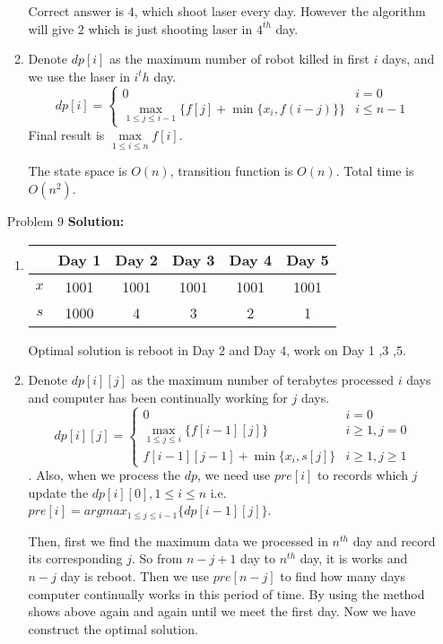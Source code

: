 \normalfont\documentclass[letterpaper,11pt]{article}
\begin{document}
\begin{enumerate}
\begin{enumerate}
		Correct answer is $4$, which shoot laser every day. However the algorithm will give $2$ which is just shooting laser in $4^{th}$ day.
	\item
	Denote $dp[i]$ as the maximum number of robot killed in first $i$ days, and we use the laser in $i^th$ day.\\
	$$ dp[i]=\left\{
		\begin{array}{ll}
		0   &    i = 0\\
		\max \limits_{1\le j \le i - 1} \{f[j] + \min\{x_i, f(i - j)\}\} &           i \le n - 1
		\end{array} \right. 
	$$
	Final result is $\max \limits_{1\le i \le n}f[i]$.\par
	The state space is $O(n)$, transition function is $O(n)$. Total time is $O(n^2)$.
\end{enumerate}
\item [Problem 9]\textbf{Solution:}\par
\begin{enumerate}
	\item
	\begin{tabular}{cccccc}
			\hline
			& Day 1&Day 2 &Day 3 &Day 4& Day 5 \\
			\hline
			$x$ & 1001 & 1001 & 1001 & 1001 & 1001 \\
			\hline
			$s$ & 1000 & 4 & 3 & 2 & 1 \\
			\hline
	\end{tabular}\par
	Optimal solution is reboot in Day 2 and Day 4, work on Day 1 ,3 ,5.\par
	\item
	Denote $dp[i][j]$ as the maximum number of terabytes processed $i$ days and computer has been continually working for $j$ days. 
	$$ dp[i][j]=\left\{
		\begin{array}{ll}
		0   &    i = 0\\
		\max \limits_{1\le j \le i} \{f[i-1][j]\} & i \ge 1, j = 0\\
		f[i-1][j-1] + \min\{x_i, s[j]\} &           i \ge 1, j \ge 1
		\end{array} \right. 
	$$.
	Also, when we process the $dp$, we need use $pre[i]$ to records which $j$ update the $dp[i][0], 1 \le i \le n$ i.e. $pre[i] = argmax_{1\le j \le i-1}\{dp[i-1][j]\}$.\par
	Then, first we find the maximum data we processed in $n^{th}$ day and record its corresponding $j$. So from $n - j + 1$ day to $n^{th}$ day, it is works and $n - j$ day is reboot. Then we use $pre[n - j]$ to find how many days computer continually works in this period of time. By using the method shows above again and again until we meet the first day. Now we have construct the optimal solution.

\end{enumerate}
\end{enumerate}
\end{document}
